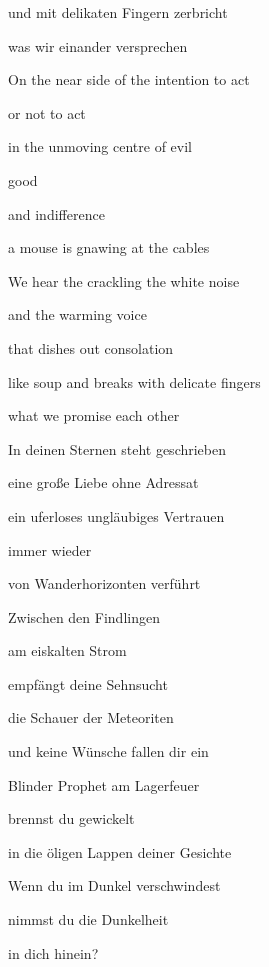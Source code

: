 und mit delikaten Fingern zerbricht

was wir einander versprechen


\bigskip



\bigskip

On the near side of the intention to act

or not to act

in the unmoving centre of evil

good

and indifference


\bigskip

a mouse is gnawing at the cables

We hear the crackling the white noise

and the warming voice

that dishes out consolation

like soup and breaks with delicate fingers 

what we promise each other


\bigskip


\bigskip



\bigskip


\bigskip

In deinen Sternen steht geschrieben

eine große Liebe ohne Adressat

ein uferloses ungläubiges Vertrauen

immer wieder

von Wanderhorizonten verführt


\bigskip

Zwischen den Findlingen

am eiskalten Strom

empfängt deine Sehnsucht

die Schauer der Meteoriten

und keine Wünsche fallen dir ein


\bigskip

Blinder Prophet am Lagerfeuer

brennst du gewickelt

in die öligen Lappen deiner Gesichte


\bigskip

Wenn du im Dunkel verschwindest

nimmst du die Dunkelheit 

in dich hinein?


